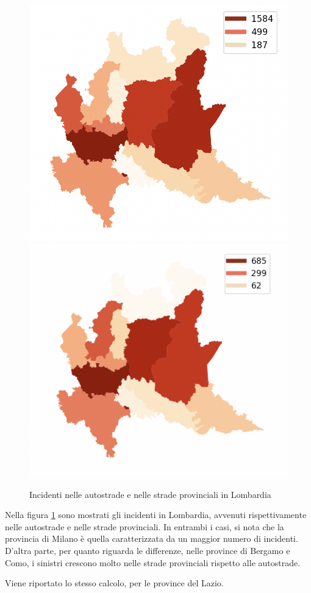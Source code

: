 \documentclass[a4paper]{report}
\begin{document}
\begin{figure}
    \includegraphics[width=0.5\linewidth]{../src/provincia/lombardia_autostrade.png}
    \includegraphics[width=0.5\linewidth]{../src/provincia/lombardia_strade_prov.png}
    \caption{Incidenti nelle autostrade e nelle strade provinciali in Lombardia}
    \label{fig:lombardia-strade}
\end{figure}

Nella figura \ref{fig:lombardia-strade} sono mostrati gli incidenti in Lombardia, 
avvenuti rispettivamente nelle autostrade e nelle strade provinciali.
In entrambi i casi, si nota che la provincia di Milano è quella caratterizzata da 
un maggior numero di incidenti. 
D'altra parte, per quanto riguarda le differenze, nelle province di Bergamo e Como, 
i sinistri crescono molto nelle strade provinciali rispetto alle autostrade.

Viene riportato lo stesso calcolo, per le province del Lazio.
\end{document}
